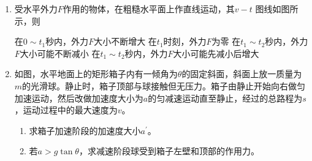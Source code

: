 \begin{enumerate}[leftmargin=0em]
\item 
{}
受水平外力$ F $作用的物体，在粗糙水平面上作直线运动，其$ v-t $ 图线如图所示，则  


\begin{minipage}[h!]{0.7\linewidth}
\vspace{0.3em}
\fourchoices
{在$ 0 \sim t_1 $秒内，外力$ F $大小不断增大}
{在$ t_{1} $时刻，外力$ F $为零}
{在$ t_1 \sim t_2 $秒内，外力$ F $大小可能不断减小}
{在$ t_1 \sim t_2 $秒内，外力$ F $大小可能先减小后增大}

\vspace{0.3em}
\end{minipage}
\hfill
\begin{minipage}[h!]{0.3\linewidth}
\flushright
\vspace{0.3em}

\vspace{0.3em}
\end{minipage}


\newpage
\item 
{}
如图，水平地面上的矩形箱子内有一倾角为$ \theta $的固定斜面，斜面上放一质量为$ m $的光滑球。静止时，箱子顶部与球接触但无压力。箱子由静止开始向右做匀加速运动，然后改做加速度大小为$ a $的匀减速运动直至静止，经过的总路程为$ s $，运动过程中的最大速度为$ v $。
\begin{enumerate}
\renewcommand{\labelenumii}{(\arabic{enumii})}

\item 
求箱子加速阶段的加速度大小$ a ^{\prime} $。

\item 
若$ a>g \tan \theta $，求减速阶段球受到箱子左壁和顶部的作用力。

\end{enumerate}
\begin{figure}[h!]
\flushright

\end{figure}

\end{enumerate}

